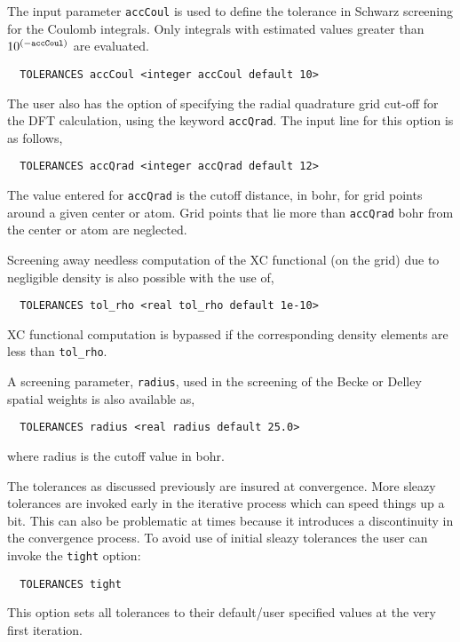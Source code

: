 The input
parameter {\tt accCoul} is used to define the tolerance in Schwarz 
screening for the Coulomb integrals.  Only integrals with estimated
values greater than $10^{(-{\tt accCoul})}$ are evaluated.

\begin{verbatim}
  TOLERANCES accCoul <integer accCoul default 10>
\end{verbatim}



The user also has the option of specifying the radial quadrature 
grid cut-off for the DFT calculation, using the keyword
\verb+accQrad+.  The input line for this option is as follows,
\begin{verbatim}
  TOLERANCES accQrad <integer accQrad default 12>
\end{verbatim}

The value entered for \verb+accQrad+ is the cutoff distance, in bohr, for grid
points around a given center or atom.  Grid points that lie more than 
\verb+accQrad+ bohr from the center or atom are neglected. 

Screening away needless computation of the XC functional (on the grid)
due to negligible density is also possible with the use of,
\begin{verbatim}
  TOLERANCES tol_rho <real tol_rho default 1e-10>
\end{verbatim}
XC functional computation is bypassed if the corresponding density
elements are less than \verb+tol_rho+.

A screening parameter, \verb+radius+, used in the screening of the
Becke or Delley spatial weights is also available as,
\begin{verbatim}
  TOLERANCES radius <real radius default 25.0>
\end{verbatim}
where radius is the cutoff value in bohr.

The tolerances as discussed previously are insured at convergence.
More sleazy tolerances are invoked early in the iterative process
which can speed things up a bit.  This can also be problematic at
times because it introduces a discontinuity in the convergence
process.  To avoid use of initial sleazy tolerances the user can
invoke the \verb+tight+ option:

\begin{verbatim}
  TOLERANCES tight 
\end{verbatim}

This option sets all tolerances to their
default/user specified values at the very first iteration.


